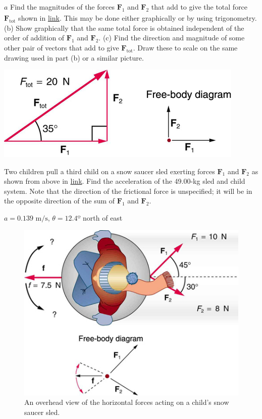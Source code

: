 \documentclass[
]{book}
\newenvironment{problems-exercises}{}{}
\begin{document}
\begin{problems-exercises}
\hypertarget{fs-id1333485}{}
\leavevmode\hypertarget{fs-id2616874}{}%
\(a\) Find the magnitudes of the forces \(\textbf{F}_{1}{}\) and
\(\textbf{F}_{2}{}\)\textsubscript{} that add to give the
total force \(\textbf{F}_{\text{tot}}{}\) shown in
\protect\hyperlink{import-auto-id2639094}{link}. This may be done
either graphically or by using trigonometry. (b) Show graphically that
the same total force is obtained independent of the order of addition of
\(\textbf{F}_{1}{}\) and \(\textbf{F}_{2}{}\). (c) Find the direction and
magnitude of some other pair of vectors that add to give
\(\textbf{F}_{\text{tot}}{}\). Draw these to scale on the same drawing
used in part (b) or a similar picture.

\includegraphics{images/Figure_04_06_04.jpg}

\hypertarget{fs-id2159386}{}
\leavevmode\hypertarget{fs-id1772127}{}%
Two children pull a third child on a snow saucer sled exerting forces
\(\textbf{F}_{1}\) and \(\textbf{F}_{2}\) as shown from above in
\protect\hyperlink{import-auto-id1789737}{link}. Find the
acceleration of the 49.00-kg sled and child system. Note that the
direction of the frictional force is unspecified; it will be in the
opposite direction of the sum of \(\textbf{F}_{1}\) and \(\textbf{F}_{2}\).

\leavevmode\hypertarget{eip-id2093801}{}%
\(a = \text{0.139\ m/s}\), \(\theta = 12.4º\) north of east

\begin{figure}
\hypertarget{import-auto-id1789737}{%
\centering
\includegraphics{images/Figure_04_06_05.jpg}
\caption{An overhead view of the horizontal forces acting on a child's snow
saucer sled.}\label{import-auto-id1789737}
}
\end{figure}


\end{problems-exercises}
\end{document}
